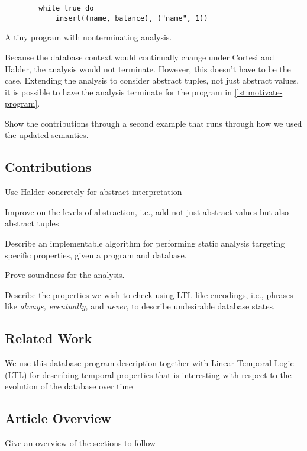 \begin{listing}
    \begin{verbatim}
        while true do
            insert((name, balance), ("name", 1))
    \end{verbatim}
    \caption{A tiny program with nonterminating analysis.}
    \label{lst:motivate-program}
\end{listing}


Because the database context would continually change under Cortesi and Halder, the analysis would not terminate.
However, this doesn't have to be the case.
Extending the analysis to consider abstract tuples, not just abstract values, it is possible to have the analysis terminate for the program in \autoref{lst:motivate-program}.

Show the contributions through a second example that runs through how we used the updated semantics.

\subsection{Contributions}\label{subsec:contributions}

Use Halder concretely for abstract interpretation

Improve on the levels of abstraction, i.e., add not just abstract values but also abstract tuples

Describe an implementable algorithm for performing static analysis targeting specific properties, given a program and database.

Prove soundness for the analysis.

Describe the properties we wish to check using LTL-like encodings, i.e., phrases like \emph{always, eventually,} and \emph{never}, to describe undesirable database states.

\subsection{Related Work}\label{subsec:related-work}

We use this database-program description together with Linear Temporal Logic (LTL) for describing temporal properties that is interesting with respect to the evolution of the database over time

\subsection{Article Overview}\label{subsec:article-overview}
Give an overview of the sections to follow


